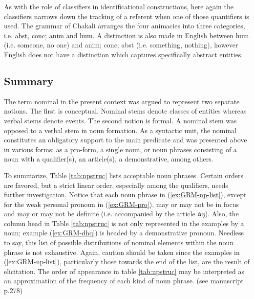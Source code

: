 \begin{exe}
\begin{exe}
\begin{exe}
{\begin{exe}
\begin{exe}
\begin{exe}
\begin{exe}
\begin{exe}
\begin{exe}
\begin{exe}
\begin{xlist}
\begin{exe}
\begin{exe}
\begin{exe}
\begin{exe}
\begin{exe}
\begin{exe}
\begin{exe}
\begin{exe}
\begin{exe}
\begin{exe}
\begin{exe}
\begin{exe}
\begin{exe}
As with the role of classifiers in identificational constructions, here again
the classifiers narrows down the tracking of a  referent when one of those
quantifiers is used. The grammar of Chakali arranges the four animacies into
three categories, i.e.  {\sc abst}, {\sc conc; anim} and {\sc hum}.  A
distinction is also made in English between {\sc hum} (i.e. someone, no one) and
 {\sc anim; conc; abst} (i.e. something, nothing), however English does not have
a distinction which captures  specifically abstract entities.

\subsection{Summary}
\label{sec:GRM-NP-sum}

The term nominal in the present context was argued to represent two separate
notions. The first is  conceptual. Nominal stems denote classes of entities
whereas verbal stems denote events. The second notion is  formal. A nominal stem
was opposed to  a verbal stem in noun formation.  As a syntactic unit,  the
nominal  constitutes an obligatory support to the main predicate and was
presented above in  various forms:   as a pro-form, a single noun, or 
 noun phrases
consisting of a noun with a qualifier(s), an article(s), a demonstrative,  among
others.

To summarize, Table \ref{tab:npstruc} lists acceptable
noun
phrases. Certain orders are
favored, but a strict linear order, especially among the qualifiers, needs 
further investigation.   Notice that each
noun phrase in (\ref{ex:GRM-np-list}), except for the weak personal pronoun in
(\ref{ex:GRM-pro}),  may or may not be in focus and may or may not be definite
(i.e. accompanied by the article {\it tɪŋ}). Also,  the column
{\sc head} in Table \ref{tab:npstruc} is not only represented in the
examples by a noun;  example (\ref{ex:GRM-dhq}) is headed by a demonstrative
pronoun. Needless to say, this list of possible distributions of nominal
elements
within the noun phrase is not exhaustive. Again, caution should be taken since
the examples in (\ref{ex:GRM-np-list}), particularly those towards the end of
the list, are the result of elicitation. The order of appearance in 
table  \ref{tab:npstruc} may be   interpreted  as  an approximation of the 
frequency of each kind of noun phrase. (see manuscript p.278)





\end{exe}
\end{exe}
\end{exe}
\end{exe}
\end{exe}
\end{exe}
\end{exe}
\end{exe}
\end{exe}
\end{exe}
\end{exe}
\end{exe}
\end{exe}
\end{xlist}
\end{exe}
\end{exe}
\end{exe}
\end{exe}
\end{exe}
\end{exe}
\end{exe}}
\end{exe}
\end{exe}
\end{exe}

